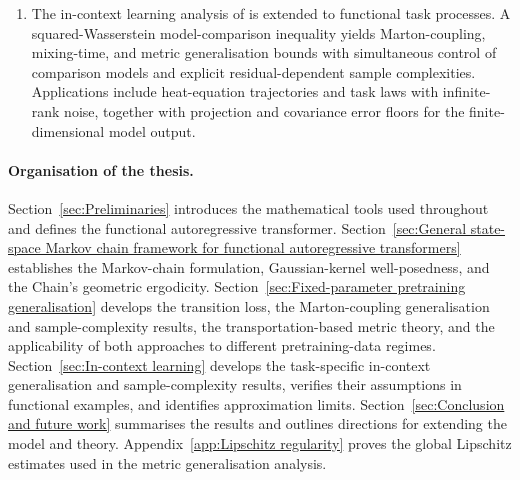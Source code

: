 \begin{enumerate}
    \item The in-context learning analysis of \cite[Section~6]{ZekriEtAl2025} is extended to functional task processes. A squared-Wasserstein model-comparison inequality yields Marton-coupling, mixing-time, and metric generalisation bounds with simultaneous control of comparison models and explicit residual-dependent sample complexities. Applications include heat-equation trajectories and task laws with infinite-rank noise, together with projection and covariance error floors for the finite-dimensional model output.
\end{enumerate}

\paragraph{Organisation of the thesis.}
Section~\ref{sec:Preliminaries} introduces the mathematical tools used throughout and defines the functional autoregressive transformer. Section~\ref{sec:General state-space Markov chain framework for functional autoregressive transformers} establishes the Markov-chain formulation, Gaussian-kernel well-posedness, and the Chain's geometric ergodicity. Section~\ref{sec:Fixed-parameter pretraining generalisation} develops the transition loss, the Marton-coupling generalisation and sample-complexity results, the transportation-based metric theory, and the applicability of both approaches to different pretraining-data regimes. Section~\ref{sec:In-context learning} develops the task-specific in-context generalisation and sample-complexity results, verifies their assumptions in functional examples, and identifies approximation limits. Section~\ref{sec:Conclusion and future work} summarises the results and outlines directions for extending the model and theory. Appendix~\ref{app:Lipschitz regularity} proves the global Lipschitz estimates used in the metric generalisation analysis.
